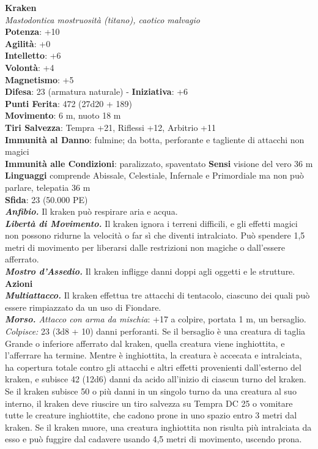 \begin{multicols}{2}
\medskip\textbf{Kraken}\\
\emph{Mastodontica mostruosità (titano), caotico malvagio}\\
\textbf{Potenza}: +10\\
\textbf{Agilità}: +0\\
\textbf{Intelletto}: +6\\
\textbf{Volontà}: +4\\
\textbf{Magnetismo}: +5\\
\textbf{Difesa}: 23 (armatura naturale) - \textbf{Iniziativa}: +6\\
\textbf{Punti Ferita}: 472 (27d20 + 189) \\
\textbf{Movimento}: 6 m, nuoto 18 m\\
\textbf{Tiri Salvezza}: Tempra +21, Riflessi +12, Arbitrio +11\\
\textbf{Immunità al Danno}: fulmine; da botta, perforante e tagliente di attacchi non magici\\
\textbf{Immunità alle Condizioni}: paralizzato, spaventato
\textbf{Sensi} visione del vero 36 m\\
\textbf{Linguaggi} comprende Abissale, Celestiale, Infernale e Primordiale ma non può parlare, telepatia 36 m \\
\textbf{Sfida}: 23 (50.000 PE)\smallskip\\
\emph{\textbf{Anfibio.}} Il kraken può respirare aria e acqua.\\
\emph{\textbf{Libertà di Movimento.}} Il kraken ignora i terreni difficili, e gli effetti magici non possono ridurne la velocità o far sì che diventi intralciato. Può spendere 1,5 metri di movimento per liberarsi dalle restrizioni non magiche o dall'essere afferrato.\\
\emph{\textbf{Mostro d'Assedio.}} Il kraken infligge danni doppi agli oggetti e le strutture.\\
\smallskip\textbf{Azioni}\\
\emph{\textbf{Multiattacco.}} Il kraken effettua tre attacchi di tentacolo, ciascuno dei quali può essere rimpiazzato da un uso di Fiondare.\\
\emph{\textbf{Morso.} Attacco con arma da mischia}: +17 a colpire, portata 1 m, un bersaglio.\\
\emph{Colpisce:} 23 (3d8 + 10) danni perforanti. Se il bersaglio è una creatura di taglia Grande o inferiore afferrato dal kraken, quella creatura viene inghiottita, e l'afferrare ha termine. Mentre è inghiottita, la creatura è accecata e intralciata, ha copertura totale contro gli attacchi e altri effetti provenienti dall'esterno del kraken, e subisce 42 (12d6) danni da acido all'inizio di ciascun turno del kraken.\\
Se il kraken subisce 50 o più danni in un singolo turno da una creatura al suo interno, il kraken deve riuscire un tiro salvezza su Tempra DC 25 o vomitare tutte le creature inghiottite, che cadono prone in uno spazio entro 3 metri dal kraken. Se il kraken muore, una creatura inghiottita non risulta più intralciata da esso e può fuggire dal cadavere usando 4,5 metri di movimento, uscendo prona.\\


\end{multicols}
